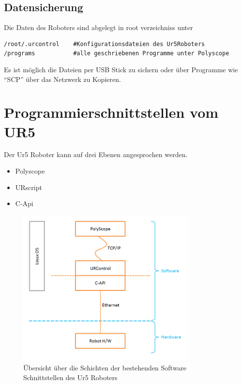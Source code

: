 \subsection{Datensicherung}
\label{ur_datensicherung_gru}

Die Daten des Roboters sind abgelegt in root verzeichniss unter 

\begin{lstlisting}[caption={Pfade Der Ur5 Relevanten Dateien}, label=lst:ur5data ,captionpos=b] 
/root/.urcontrol    #Konfigurationsdateien des Ur5Roboters
/programs   		#alle geschriebenen Programme unter Polyscope
\end{lstlisting}

Es ist möglich die Dateien per USB Stick zu sichern oder über Programme wie ``SCP'' über das Netzwerk zu Kopieren.

\section{Programmierschnittstellen vom UR5}
\label{sec:programm_api_uebersicht_gru}

Der Ur5 Roboter kann auf drei Ebenen angesprochen werden.\\

\begin{itemize}
\item Polyscope
\item URscript
\item C-Api
\end{itemize}

\begin{figure}[ht]
  \centering
    \includegraphics[width=0.8\textwidth]{pic/ur_programming_levels.png}
      \caption[Schichten der Software Schnittstellen]{Übersicht über die
      Schichten der bestehenden Software Schnittstellen des Ur5 Roboters}
      \label{fig:schnittstellen_schichten}
\end{figure}

